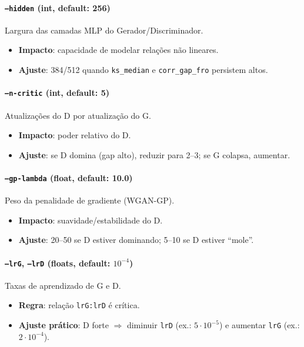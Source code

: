 \documentclass[11pt,a4paper]{article}
\begin{document}
\paragraph{\texttt{--hidden} (int, default: 256)} Largura das camadas MLP do Gerador/Discriminador.
\begin{itemize}[leftmargin=1.2em]
  \item \textbf{Impacto}: capacidade de modelar relações não lineares.
  \item \textbf{Ajuste}: 384/512 quando \texttt{ks\_median} e \texttt{corr\_gap\_fro} persistem altos.
\end{itemize}

\paragraph{\texttt{--n-critic} (int, default: 5)} Atualizações do D por atualização do G.
\begin{itemize}[leftmargin=1.2em]
  \item \textbf{Impacto}: poder relativo do D.
  \item \textbf{Ajuste}: se D domina (gap alto), reduzir para 2--3; se G colapsa, aumentar.
\end{itemize}

\paragraph{\texttt{--gp-lambda} (float, default: 10.0)} Peso da penalidade de gradiente (WGAN-GP).
\begin{itemize}[leftmargin=1.2em]
  \item \textbf{Impacto}: suavidade/estabilidade do D.
  \item \textbf{Ajuste}: 20--50 se D estiver dominando; 5--10 se D estiver ``mole''.
\end{itemize}

\paragraph{\texttt{--lrG}, \texttt{--lrD} (floats, default: $10^{-4}$)} Taxas de aprendizado de G e D.
\begin{itemize}[leftmargin=1.2em]
  \item \textbf{Regra}: relação \texttt{lrG:lrD} é crítica.
  \item \textbf{Ajuste prático}: D forte $\Rightarrow$ diminuir \texttt{lrD} (ex.: $5\cdot10^{-5}$) e aumentar \texttt{lrG} (ex.: $2\cdot10^{-4}$).
\end{itemize}
\end{document}
